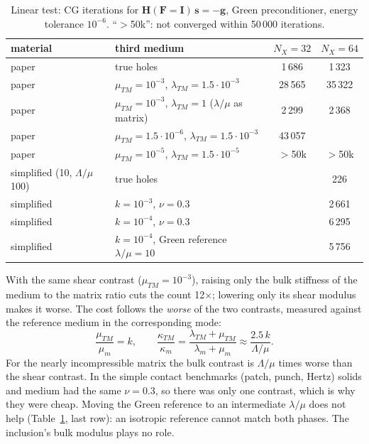 \documentclass[11pt,a4paper]{article}
\begin{document}
\begin{table}[h]
\centering
\caption{Linear test: CG iterations for $\bm H(\bm F = \bm I)\,\bm s = -\bm g$, Green preconditioner,
energy tolerance $10^{-6}$. ``$>$50k'': not converged within 50\,000 iterations.}
\label{tab:linear}
\begin{tabular}{llcc}
\toprule
material & third medium & $N_X = 32$ & $N_X = 64$ \\
\midrule
paper                         & true holes                                     & 1\,686 & 1\,323 \\
paper                         & $\mu_{TM} = 10^{-3}$, $\lambda_{TM} = 1.5\cdot10^{-3}$ & 28\,565 & 35\,322 \\
paper                         & $\mu_{TM} = 10^{-3}$, $\lambda_{TM} = 1$ ($\lambda/\mu$ as matrix) & 2\,299 & 2\,368 \\
paper                         & $\mu_{TM} = 1.5\cdot10^{-6}$, $\lambda_{TM} = 1.5\cdot10^{-3}$ & 43\,057 & \\
paper                         & $\mu_{TM} = 10^{-5}$, $\lambda_{TM} = 1.5\cdot10^{-5}$ & $>$50k & $>$50k \\
simplified (10, $\Lambda/\mu$ 100) & true holes                                & & 226 \\
simplified                    & $k = 10^{-3}$, $\nu = 0.3$                     & & 2\,661 \\
simplified                    & $k = 10^{-4}$, $\nu = 0.3$                     & & 6\,295 \\
simplified                    & $k = 10^{-4}$, Green reference $\lambda/\mu = 10$ & & 5\,756 \\
\bottomrule
\end{tabular}
\end{table}

With the same shear contrast ($\mu_{TM} = 10^{-3}$), raising only the bulk stiffness of the medium to the matrix ratio
cuts the count 12$\times$; lowering only its shear modulus makes it worse. The cost follows the \emph{worse} of the
two contrasts, measured against the reference medium in the corresponding mode:
\begin{equation}
  \frac{\mu_{TM}}{\mu_m} = k , \qquad
  \frac{\kappa_{TM}}{\kappa_m} = \frac{\lambda_{TM}+\mu_{TM}}{\lambda_m+\mu_m} \approx \frac{2.5\,k}{\Lambda/\mu} .
\end{equation}
For the nearly incompressible matrix the bulk contrast is $\Lambda/\mu$ times worse than the shear contrast. In the
simple contact benchmarks (patch, punch, Hertz) solids and medium had the same $\nu = 0.3$, so there was only one
contrast, which is why they were cheap. Moving the Green reference to an intermediate $\lambda/\mu$ does not help
(Table~\ref{tab:linear}, last row): an isotropic reference cannot match both phases. The inclusion's bulk modulus
plays no role.
\end{document}
